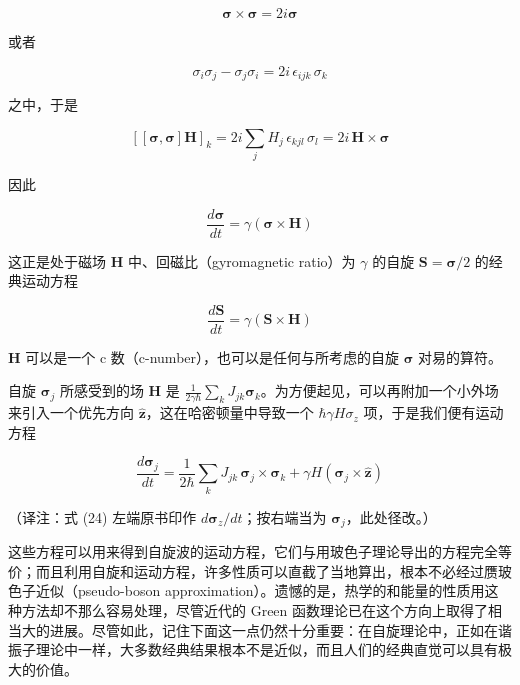 \begin{equation*}
\boldsymbol{\sigma}\times\boldsymbol{\sigma} = 2i\boldsymbol{\sigma}
\end{equation*}

或者

\begin{equation*}
\sigma_{i}\sigma_{j} - \sigma_{j}\sigma_{i} = 2i\,\epsilon_{ijk}\,\sigma_{k}
\end{equation*}

之中，于是

\begin{equation*}
\left[\left[\boldsymbol{\sigma},\boldsymbol{\sigma}\right]\mathbf{H}\right]_{k} = 2i\sum_{j} H_{j}\,\epsilon_{kjl}\,\sigma_{l} = 2i\,\mathbf{H}\times\boldsymbol{\sigma}
\end{equation*}

因此

\begin{equation*}
\frac{d\boldsymbol{\sigma}}{dt} = \gamma\left(\boldsymbol{\sigma}\times\mathbf{H}\right)
\end{equation*}

这正是处于磁场 $\mathbf{H}$ 中、回磁比（gyromagnetic ratio）为 $\gamma$ 的自旋 $\mathbf{S} = \boldsymbol{\sigma}/2$ 的经典运动方程

\begin{equation*}
\frac{d\mathbf{S}}{dt} = \gamma\left(\mathbf{S}\times\mathbf{H}\right)
\end{equation*}

$\mathbf{H}$ 可以是一个 c 数（c-number），也可以是任何与所考虑的自旋 $\boldsymbol{\sigma}$ 对易的算符。

自旋 $\boldsymbol{\sigma}_{j}$ 所感受到的场 $\mathbf{H}$ 是 $\frac{1}{2\gamma\hbar}\sum_{k} J_{jk}\boldsymbol{\sigma}_{k}$。为方便起见，可以再附加一个小外场来引入一个优先方向 $\hat{\mathbf{z}}$，这在哈密顿量中导致一个 $\hbar\gamma H\sigma_{z}$ 项，于是我们便有运动方程

\begin{equation*}
\frac{d\boldsymbol{\sigma}_{j}}{dt} = \frac{1}{2\hbar}\sum_{k} J_{jk}\,\boldsymbol{\sigma}_{j}\times\boldsymbol{\sigma}_{k} + \gamma H\left(\boldsymbol{\sigma}_{j}\times\hat{\mathbf{z}}\right) \tag{24}
\end{equation*}

（译注：式 (24) 左端原书印作 $d\boldsymbol{\sigma}_{z}/dt$；按右端当为 $\boldsymbol{\sigma}_{j}$，此处径改。）

这些方程可以用来得到自旋波的运动方程，它们与用玻色子理论导出的方程完全等价；而且利用自旋和运动方程，许多性质可以直截了当地算出，根本不必经过赝玻色子近似（pseudo-boson approximation）。遗憾的是，热学的和能量的性质用这种方法却不那么容易处理，尽管近代的 Green 函数理论已在这个方向上取得了相当大的进展。尽管如此，记住下面这一点仍然十分重要：在自旋理论中，正如在谐振子理论中一样，大多数经典结果根本不是近似，而且人们的经典直觉可以具有极大的价值。

